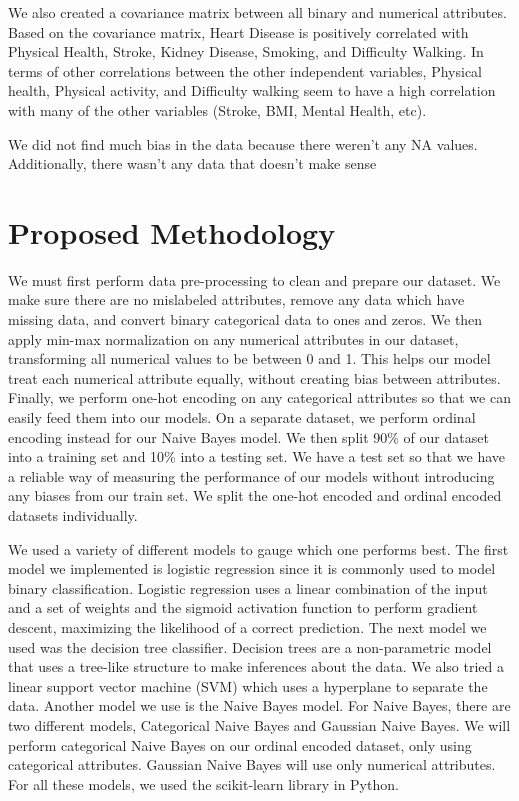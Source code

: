 \documentclass[a4paper]{article}
\begin{document}
We also created a covariance matrix between all binary and numerical attributes. Based on the covariance matrix, Heart Disease is positively correlated with Physical Health, Stroke, Kidney Disease, Smoking, and Difficulty Walking. In terms of other correlations between the other independent variables, Physical health, Physical activity, and Difficulty walking seem to have a high correlation with many of the other variables (Stroke, BMI, Mental Health, etc). 

We did not find much bias in the data because there weren’t any NA values. Additionally, there wasn’t any data that doesn’t make sense


\section{Proposed Methodology}

We must first perform data pre-processing to clean and prepare our dataset. We make sure there are no mislabeled attributes, remove any data which have missing data, and convert binary categorical data to ones and zeros. We then apply min-max normalization on any numerical attributes in our dataset, transforming all numerical values to be between 0 and 1. This helps our model treat each numerical attribute equally, without creating bias between attributes. Finally, we perform one-hot encoding on any categorical attributes so that we can easily feed them into our models. On a separate dataset, we perform ordinal encoding instead for our Naive Bayes model.
We then split 90\% of our dataset into a training set and 10\% into a testing set. We have a test set so that we have a reliable way of measuring the performance of our models without introducing any biases from our train set. We split the one-hot encoded and ordinal encoded datasets individually. 
	
We used a variety of different models to gauge which one performs best. The first model we implemented is logistic regression since it is commonly used to model binary classification. Logistic regression uses a linear combination of the input and a set of weights and the sigmoid activation function to perform gradient descent, maximizing the likelihood of a correct prediction. The next model we used was the decision tree classifier. Decision trees are a non-parametric model that uses a tree-like structure to make inferences about the data. We also tried a linear support vector machine (SVM) which uses a hyperplane to separate the data. Another model we use is the Naive Bayes model. For Naive Bayes, there are two different models, Categorical Naive Bayes and Gaussian Naive Bayes. We will perform categorical Naive Bayes on our ordinal encoded dataset, only using categorical attributes. Gaussian Naive Bayes will use only numerical attributes. For all these models, we used the scikit-learn library in Python.
\end{document}
